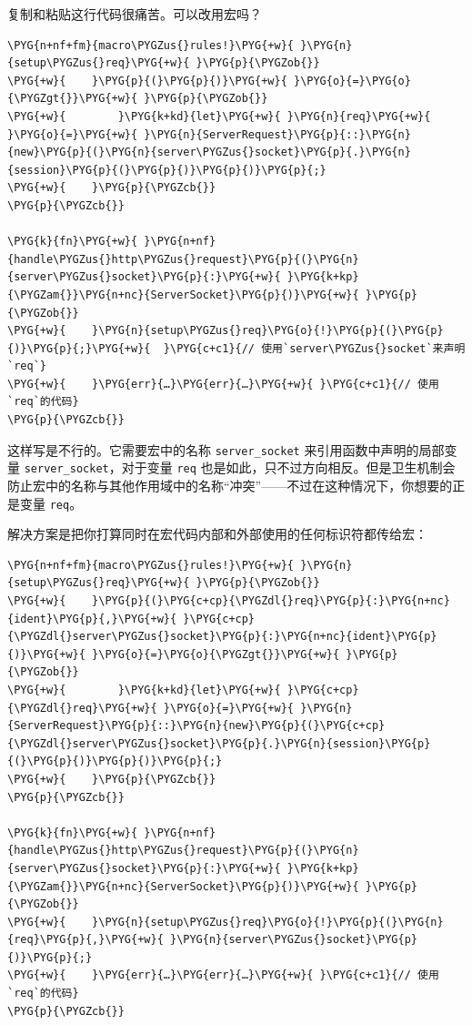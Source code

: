 复制和粘贴这行代码很痛苦。可以改用宏吗？

\begin{Verbatim}[commandchars=\\\{\},breaklines=true,breakanywhere=true,fontsize=\codefont,xleftmargin=17bp]
\PYG{n+nf+fm}{macro\PYGZus{}rules!}\PYG{+w}{ }\PYG{n}{setup\PYGZus{}req}\PYG{+w}{ }\PYG{p}{\PYGZob{}}
\PYG{+w}{    }\PYG{p}{(}\PYG{p}{)}\PYG{+w}{ }\PYG{o}{=}\PYG{o}{\PYGZgt{}}\PYG{+w}{ }\PYG{p}{\PYGZob{}}
\PYG{+w}{        }\PYG{k+kd}{let}\PYG{+w}{ }\PYG{n}{req}\PYG{+w}{ }\PYG{o}{=}\PYG{+w}{ }\PYG{n}{ServerRequest}\PYG{p}{::}\PYG{n}{new}\PYG{p}{(}\PYG{n}{server\PYGZus{}socket}\PYG{p}{.}\PYG{n}{session}\PYG{p}{(}\PYG{p}{)}\PYG{p}{)}\PYG{p}{;}
\PYG{+w}{    }\PYG{p}{\PYGZcb{}}
\PYG{p}{\PYGZcb{}}

\PYG{k}{fn}\PYG{+w}{ }\PYG{n+nf}{handle\PYGZus{}http\PYGZus{}request}\PYG{p}{(}\PYG{n}{server\PYGZus{}socket}\PYG{p}{:}\PYG{+w}{ }\PYG{k+kp}{\PYGZam{}}\PYG{n+nc}{ServerSocket}\PYG{p}{)}\PYG{+w}{ }\PYG{p}{\PYGZob{}}
\PYG{+w}{    }\PYG{n}{setup\PYGZus{}req}\PYG{o}{!}\PYG{p}{(}\PYG{p}{)}\PYG{p}{;}\PYG{+w}{  }\PYG{c+c1}{// 使用`server\PYGZus{}socket`来声明`req`}
\PYG{+w}{    }\PYG{err}{…}\PYG{err}{…}\PYG{+w}{ }\PYG{c+c1}{// 使用`req`的代码}
\PYG{p}{\PYGZcb{}}
\end{Verbatim}

这样写是不行的。它需要宏中的名称 \texttt{server\_socket} 来引用函数中声明的局部变量 \texttt{server\_socket}，对于变量 \texttt{req} 也是如此，只不过方向相反。但是卫生机制会防止宏中的名称与其他作用域中的名称“冲突”——不过在这种情况下，你想要的正是变量 \texttt{req}。

解决方案是把你打算同时在宏代码内部和外部使用的任何标识符都传给宏：

\begin{Verbatim}[commandchars=\\\{\},breaklines=true,breakanywhere=true,fontsize=\codefont,xleftmargin=17bp]
\PYG{n+nf+fm}{macro\PYGZus{}rules!}\PYG{+w}{ }\PYG{n}{setup\PYGZus{}req}\PYG{+w}{ }\PYG{p}{\PYGZob{}}
\PYG{+w}{    }\PYG{p}{(}\PYG{c+cp}{\PYGZdl{}req}\PYG{p}{:}\PYG{n+nc}{ident}\PYG{p}{,}\PYG{+w}{ }\PYG{c+cp}{\PYGZdl{}server\PYGZus{}socket}\PYG{p}{:}\PYG{n+nc}{ident}\PYG{p}{)}\PYG{+w}{ }\PYG{o}{=}\PYG{o}{\PYGZgt{}}\PYG{+w}{ }\PYG{p}{\PYGZob{}}
\PYG{+w}{        }\PYG{k+kd}{let}\PYG{+w}{ }\PYG{c+cp}{\PYGZdl{}req}\PYG{+w}{ }\PYG{o}{=}\PYG{+w}{ }\PYG{n}{ServerRequest}\PYG{p}{::}\PYG{n}{new}\PYG{p}{(}\PYG{c+cp}{\PYGZdl{}server\PYGZus{}socket}\PYG{p}{.}\PYG{n}{session}\PYG{p}{(}\PYG{p}{)}\PYG{p}{)}\PYG{p}{;}
\PYG{+w}{    }\PYG{p}{\PYGZcb{}}
\PYG{p}{\PYGZcb{}}

\PYG{k}{fn}\PYG{+w}{ }\PYG{n+nf}{handle\PYGZus{}http\PYGZus{}request}\PYG{p}{(}\PYG{n}{server\PYGZus{}socket}\PYG{p}{:}\PYG{+w}{ }\PYG{k+kp}{\PYGZam{}}\PYG{n+nc}{ServerSocket}\PYG{p}{)}\PYG{+w}{ }\PYG{p}{\PYGZob{}}
\PYG{+w}{    }\PYG{n}{setup\PYGZus{}req}\PYG{o}{!}\PYG{p}{(}\PYG{n}{req}\PYG{p}{,}\PYG{+w}{ }\PYG{n}{server\PYGZus{}socket}\PYG{p}{)}\PYG{p}{;}
\PYG{+w}{    }\PYG{err}{…}\PYG{err}{…}\PYG{+w}{ }\PYG{c+c1}{// 使用`req`的代码}
\PYG{p}{\PYGZcb{}}
\end{Verbatim}

